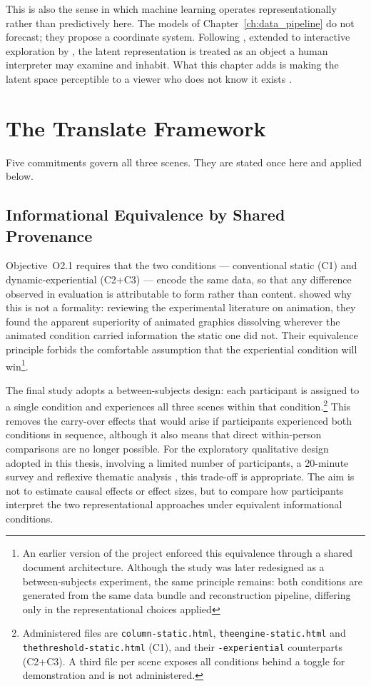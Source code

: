 This is also the sense in which machine learning operates representationally rather than predictively here. The models of Chapter~\ref{ch:data_pipeline} do not forecast; they propose a coordinate system. Following \textcite{iten2020}, extended to interactive exploration by \textcite{camps2019}, the latent representation is treated as an object a human interpreter may examine and inhabit. What this chapter adds is making the latent space perceptible to a viewer who does not know it exists \parencite{sacha2018}.

\section{The Translate Framework}
\label{sec:translate-framework}
 
Five commitments govern all three scenes. They are stated once here and applied below.
 
\subsection{Informational Equivalence by Shared Provenance}
\label{subsec:equivalence}
 
Objective~O2.1 requires that the two conditions --- conventional static (C1) and dynamic-experiential (C2+C3) --- encode the same data, so that any difference observed in evaluation is attributable to form rather than content. \textcite{tversky2002} showed why this is not a formality: reviewing the experimental literature on animation, they found the apparent superiority of animated graphics dissolving wherever the animated condition carried information the static one did not. Their equivalence principle forbids the comfortable assumption that the experiential condition will win\footnote{An earlier version of the project enforced this equivalence through a shared document architecture. Although the study was later redesigned as a between-subjects experiment, the same principle remains: both conditions are generated from the same data bundle and reconstruction pipeline, differing only in the representational choices applied}.
 
The final study adopts a between-subjects design: each participant is assigned to a single condition and experiences all three scenes within that condition.\footnote{Administered files are \texttt{column-static.html}, \texttt{theengine-static.html} and \texttt{thethreshold-static.html} (C1), and their \texttt{-experiential} counterparts (C2+C3). A third file per scene exposes all conditions behind a toggle for demonstration and is not administered.} This removes the carry-over effects that would arise if participants experienced both conditions in sequence, although it also means that direct within-person comparisons are no longer possible. For the exploratory qualitative design adopted in this thesis, involving a limited number of participants, a 20-minute survey and reflexive thematic analysis \parencite{braunclarke2006}, this trade-off is appropriate. The aim is not to estimate causal effects or effect sizes, but to compare how participants interpret the two representational approaches under equivalent informational conditions.
 

